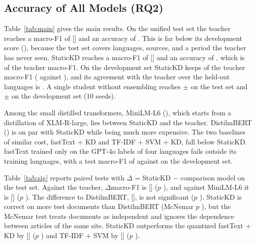 \subsection{Accuracy of All Models (RQ2)}
\label{sec:res-acc}
\TabMain
Table~\ref{tab:main} gives the main results. On the unified test set the teacher reaches a macro-F1 of  [] and an accuracy of . This is far below its development score (), because the test set covers languages, sources, and a period the teacher has never seen. StaticKD reaches a macro-F1 of  [] and an accuracy of , which is  of the teacher macro-F1. On the development set StaticKD keeps  of the teacher macro-F1 ( against ), and its agreement with the teacher over the  held-out languages is . A single student without ensembling reaches  $\pm$  on the test set and  $\pm$  on the development set (10 seeds).

Among the small distilled transformers, MiniLM-L6 (), which starts from a distillation of XLM-R-large, lies between StaticKD and the teacher. DistilmBERT () is on par with StaticKD while being much more expensive. The two baselines of similar cost, fastText + KD and TF-IDF + SVM + KD, fall below StaticKD. fastText trained only on the GPT-4o labels of four languages fails outside its training languages, with a test macro-F1 of  against  on the development set.

\TabSig
Table~\ref{tab:sig} reports paired tests with $\Delta$ = StaticKD $-$ comparison model on the test set. Against the teacher, $\Delta$macro-F1 is  [] ($p$ ), and against MiniLM-L6 it is  [] ($p$ ). The difference to DistilmBERT,  [], is not significant ($p$ ). StaticKD is correct on more test documents than DistilmBERT (McNemar $p$ ), but the McNemar test treats documents as independent and ignores the dependence between articles of the same site. StaticKD outperforms the quantized fastText + KD by  [] ($p$ ) and TF-IDF + SVM by  [] ($p$ ).

